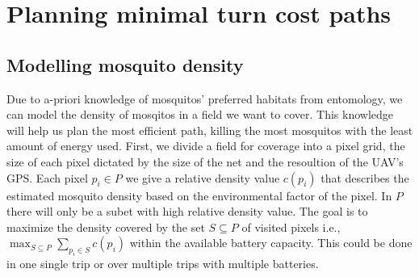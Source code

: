 \section[Path Planning]{Planning minimal turn cost paths}

\newcommand{\revised}[1]{{\color{red}#1}}


\subsection{Modelling mosquito density}
\label{subsec:modelling}
Due to a-priori knowledge of mosquitos' preferred habitats from entomology, we can model the density of mosqitos in a field we want to cover.
This knowledge will help us plan the most efficient path, killing the most mosquitos with the least amount of energy used.
First, we divide a field for coverage into a pixel grid, the size of each pixel dictated by the size of the net and the resoultion of the UAV's GPS.
Each pixel $p_i\in P$ we give a relative density value $c(p_i)$ that describes the estimated mosquito density based on the environmental factor of the pixel.
In $P$ there will only be a subet with high relative density value.
The goal is to maximize the density covered by the set $S\subseteq P$ of visited pixels i.e., $\max_{S\subseteq P} \sum_{p_i\in S} c(p_i)$ within the available battery capacity.
This could be done in one single trip or over multiple trips with multiple batteries.


